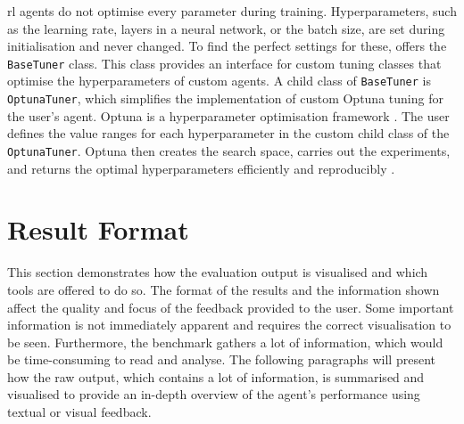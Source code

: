 \ac{rl} agents do not optimise every parameter during training. Hyperparameters, such as the learning rate, layers in a neural network, or the batch size, are set during initialisation and never changed. To find the perfect settings for these, \benchmark offers the \texttt{BaseTuner} class. This class provides an interface for custom tuning classes that optimise the hyperparameters of custom agents. A child class of \texttt{BaseTuner} is \texttt{OptunaTuner}, which simplifies the implementation of custom Optuna tuning for the user's agent. Optuna is a hyperparameter optimisation framework \cite{optuna}. The user defines the value ranges for each hyperparameter in the custom child class of the \texttt{OptunaTuner}. Optuna then creates the search space, carries out the experiments, and returns the optimal hyperparameters efficiently and reproducibly \cite{optuna}.



\section{Result Format}\label{sec:result-format}
This section demonstrates how the evaluation output is visualised and which tools are offered to do so. The format of the results and the information shown affect the quality and focus of the feedback provided to the user. Some important information is not immediately apparent and requires the correct visualisation to be seen. Furthermore, the benchmark gathers a lot of information, which would be time-consuming to read and analyse. The following paragraphs will present how the raw output, which contains a lot of information, is summarised and visualised to provide an in-depth overview of the agent's performance using textual or visual feedback.

